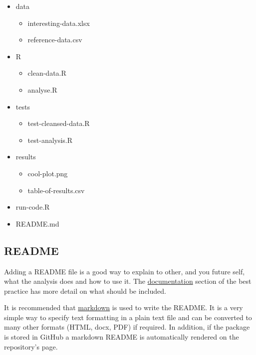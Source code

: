 \documentclass[]{book}
\providecommand{\tightlist}{%
  \setlength{\itemsep}{0pt}\setlength{\parskip}{0pt}}
\begin{document}
\begin{itemize}
\tightlist
\item
  data

  \begin{itemize}
  \tightlist
  \item
    interesting-data.xlsx
  \item
    reference-data.csv
  \end{itemize}
\item
  R

  \begin{itemize}
  \tightlist
  \item
    clean-data.R
  \item
    analyse.R
  \end{itemize}
\item
  tests

  \begin{itemize}
  \tightlist
  \item
    test-cleansed-data.R
  \item
    test-analysis.R
  \end{itemize}
\item
  results

  \begin{itemize}
  \tightlist
  \item
    cool-plot.png
  \item
    table-of-results.csv
  \end{itemize}
\item
  run-code.R
\item
  README.md
\end{itemize}

\hypertarget{readme}{%
\subsection{README}\label{readme}}

Adding a README file is a good way to explain to other, and you future self, what the analysis
does and how to use it. The \href{index.html\#documentation}{documentation} section of the best
practice has more detail on what should be included.

It is recommended that \href{http://rmarkdown.rstudio.com/lesson-8.html}{markdown} is used to
write the README. It is a very simple way to specify text formatting in a plain text file
and can be converted to many other formats (HTML, docx, PDF) if required. In addition, if
the package is stored in GitHub a markdown README is automatically rendered on the
repository's page.
\end{document}
